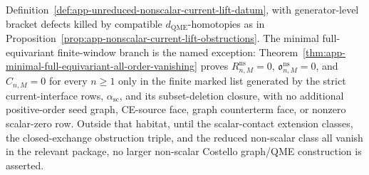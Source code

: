 \begin{stmt}
  Definition~\ref{def:app-unreduced-nonscalar-current-lift-datum}, with
  generator-level bracket defects killed by compatible
  \(d_{\mathrm{QME}}\)-homotopies as in
  Proposition~\ref{prop:app-nonscalar-current-lift-obstructions}.
  The minimal full-equivariant finite-window branch is the named exception:
  Theorem~\ref{thm:app-minimal-full-equivariant-all-order-vanishing}
  proves \(R^{\mathrm{ns}}_{n,M}=0\),
  \(\mathfrak o^{\mathrm{ns}}_{n,M}=0\), and \(C_{n,M}=0\) for every
  \(n\geq1\) only in the finite marked list generated by the strict
  current-interface rows, \(\alpha_{\mathrm{sc}}\), and its
  subset-deletion closure, with no additional positive-order seed graph,
  CE-source face, graph counterterm face, or nonzero scalar-zero row.
  Outside that habitat, until the scalar-contact extension classes, the
  closed-exchange obstruction triple, and the reduced non-scalar class all
  vanish in the relevant package, no larger non-scalar Costello graph/QME
  construction is asserted.
\end{stmt}

